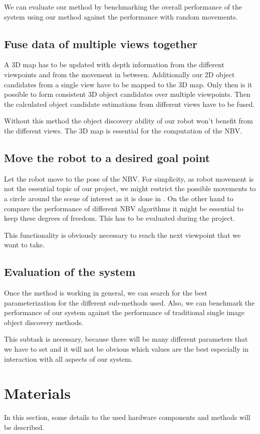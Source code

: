 \documentclass[a4paper,11pt,english]{article}
\begin{document}
We can evaluate our method by benchmarking the overall performance of the system using our method against the performance with random movements.

\subsection{Fuse data of multiple views together}
A 3D map has to be updated with depth information from the different viewpoints and from the movement in between.
Additionally our 2D object candidates from a single view have to be mapped to the 3D map.
Only then is it possible to form consistent 3D object candidates over multiple viewpoints.
Then the calculated object candidate estimations from different views have to be fused.

Without this method the object discovery ability of our robot won't benefit from the different views.
The 3D map is essential for the computation of the NBV.

\subsection{Move the robot to a desired goal point}
Let the robot move to the pose of the NBV.
For simplicity, as robot movement is not the essential topic of our project, we might restrict the possible movements to a circle around the scene of interest as it is done in \cite{atanasov2014nonmyopic}. On the other hand to compare the performance of different NBV algorithms it might be essential to keep these degrees of freedom. This has to be evaluated during the project.

This functionality is obviously necessary to reach the next viewpoint that we want to take.

\subsection{Evaluation of the system}
Once the method is working in general, we can search for the best parameterization for the different sub-methods used.
Also, we can benchmark the performance of our system against the performance of traditional single image object discovery methods.

This subtask is necessary, because there will be many different parameters that we have to set and it will not be obvious which values are the best especially in interaction with all aspects of our system.

\section{Materials}
In this section, some details to the used hardware components and methods will be described.
\end{document}
